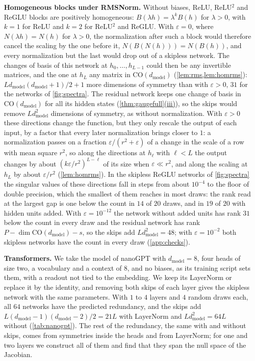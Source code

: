 \documentclass[10pt]{article}
\theoremstyle{definition}
\theoremstyle{remark}
\newcommand{\dm}{d_{\mathrm{model}}}
\newcommand{\CO}{\mathrm{CO}}
\newcommand{\para}[1]{\smallskip\noindent\textbf{#1}\hspace{0.5em}}
\DeclareRobustCommand{\cpref}[2]{\hyperref[#1:#2]{\cref*{#1}(#2)}}
\begin{document}
\para{Homogeneous blocks under RMSNorm.} Without biases, ReLU, ReLU$^2$ and ReGLU blocks are positively homogeneous: $B(\lambda h) = \lambda^k B(h)$ for $\lambda > 0$, with $k = 1$ for ReLU and $k = 2$ for ReLU$^2$ and ReGLU. With $\varepsilon = 0$, where $N(\lambda h) = N(h)$ for $\lambda > 0$, the normalization after such a block would therefore cancel the scaling by the one before it, $N(B(N(h))) = N(B(h))$, and every normalization but the last would drop out of a skipless network. The changes of basis of this network at $h_0, \dots, h_{L-1}$ could then be any invertible matrices, and the one at $h_L$ any matrix in $\CO(\dm)$ (\cref{lem:rms,lem:homrms}): $L\dm(\dm+1)/2 + 1$ more dimensions of symmetry than with $\varepsilon > 0$, $31$ for the networks of \cref{fig:spectra}. The residual network keeps one change of basis in $\CO(\dm)$ for all its hidden states (\cpref{thm:gaugefull}{iii}), so the skips would remove $L\dm^2$ dimensions of symmetry, as without normalization. With $\varepsilon > 0$ these directions change the function, but they only rescale the output of each input, by a factor that every later normalization brings closer to $1$: a normalization passes on a fraction $\varepsilon/(r^2 + \varepsilon)$ of a change in the scale of a row with mean square $r^2$, so along the directions at $h_\ell$ with $\ell < L$ the output changes by about $(k\varepsilon/r^2)^{L-\ell}$ of its size when $\varepsilon \ll r^2$, and along the scaling at $h_L$ by about $\varepsilon/r^2$ (\cref{lem:homrms}). In the skipless ReGLU networks of \cref{fig:spectra} the singular values of these directions fall in steps from about $10^{-4}$ to the floor of double precision, which the smallest of them reaches in most draws: the rank read at the largest gap is one below the count in $14$ of $20$ draws, and in $19$ of $20$ with hidden units added. With $\varepsilon = 10^{-12}$ the network without added units has rank $31$ below the count in every draw and the residual network has rank $P - \dim\CO(\dm) - s$, so the skips add $L\dm^2 = 48$; with $\varepsilon = 10^{-2}$ both skipless networks have the count in every draw (\cref{app:checks}).

\para{Transformers.} We take the model of nanoGPT \citep{karpathy2023nanogpt} with $\dm = 8$, four heads of size two, a vocabulary and a context of $8$, and no biases, as its training script sets them, with a readout not tied to the embedding. We keep its LayerNorm or replace it by the identity, and removing both skips of each layer gives the skipless network with the same parameters. With $1$ to $4$ layers and $4$ random draws each, all $64$ networks have the predicted redundancy, and the skips add $L(\dm-1)(\dm-2)/2 = 21L$ with LayerNorm and $L\dm^2 = 64L$ without (\cref{tab:nanogpt}). The rest of the redundancy, the same with and without skips, comes from symmetries inside the heads and from LayerNorm; for one and two layers we construct all of them and find that they span the null space of the Jacobian.
\end{document}
